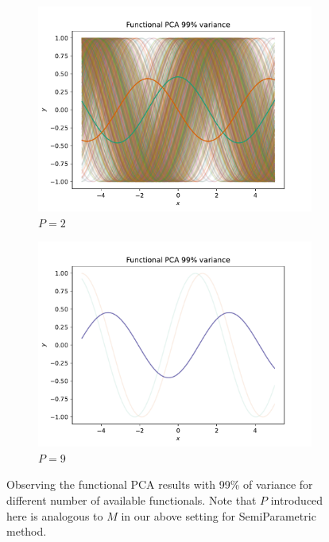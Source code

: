 \documentclass{tran-l}
\theoremstyle{definition}
\theoremstyle{remark}
\numberwithin{equation}{section}
\begin{document}
\begin{figure}[h!]
   \centering
   \begin{subfigure}[b]{0.45\textwidth}
     \centering
     \includegraphics[width=\textwidth]{Figures/functional_pca_res/illustration}
     \caption{$P=2$}
   \end{subfigure}
   \hfill
   \begin{subfigure}[b]{0.45\textwidth}
     \centering
     \includegraphics[width=\textwidth]{Figures/functional_pca_res/illustration-2}
     \caption{$P=9$}
   \end{subfigure}
   \caption{Observing the functional PCA results with 99\% of variance for different number of available functionals. Note that $P$ introduced here is analogous to $M$ in our above setting for SemiParametric method.}
\end{figure}
\end{document}
